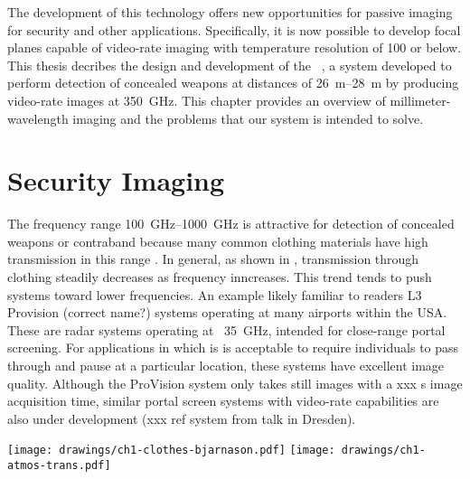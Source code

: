 The development of this technology offers new opportunities for passive imaging for security and other applications.
Specifically, it is now possible to develop focal planes capable of video-rate imaging with temperature resolution of \SI{100}{\mK} or below.
This thesis decribes the design and development of the \NIST\ \Imager, a system developed to perform detection of concealed weapons at distances of \SIrange{26}{28}{\m} by producing video-rate images at \SI{350}{\GHz}.
This chapter provides an overview of millimeter-wavelength imaging and the problems that our system is intended to solve.

\section{Security Imaging}

The frequency range \SIrange{100}{1000}{\GHz} is attractive for detection of concealed weapons or contraband because many common clothing materials have high transmission in this range \cite{bjarnason_millimeter-wave_2004}.
In general, as shown in , transmission through clothing steadily decreases as frequency inncreases.
This trend tends to push systems toward lower frequencies.
An example likely familiar to readers L3 Provision (correct name?) systems operating at many airports within the USA.
These are radar systems operating at ~\SI{35}{\GHz}, intended for close-range portal screening.
For applications in which is is acceptable to require individuals to pass through and pause at a particular location, these systems have excellent image quality.
Although the ProVision system only takes still images with a xxx s image acquisition time, similar portal screen systems with video-rate capabilities are also under development (xxx ref system from talk in Dresden).

\begin{figure*}
\centering
\texttt{[image: drawings/ch1-clothes-bjarnason.pdf]}
\texttt{[image: drawings/ch1-atmos-trans.pdf]}
\caption[Clothing and Atmospheric Transmission vs Frequency]{
  \textbf{Left}
  Plot of clothing transmission vs frequency.
  Taken from \cite{bjarnason_millimeter-wave_2004}.
  As frequency increases, transmission through all kinds of clothing decreases.
  The \SI{-10}{\dB} observation band of the \Imager\ is highlighted (\SIrange{318}{376}{\GHz}).
  \textbf{right}
  Plot showing a model of zenith atmospheric transmission on the summit of Mauna Kea, assuming \SI{0.5}{\mm} of percipital water vapor.
  The plot is illustrative only, demonstrating the presence of atmospheric transmission windows and the general trend of worse transmission at higher frequencies.
  The data was obtained using the Caltech Submillimeter Observatory (CSO) Atmospheric Transmission Interactive Plotter \cite{darek_lis_cso_????}, which is based on a published model \cite{pardo_atmospheric_2001}.
}
\label{fig:ch1-clothes-atmos-trans}
\end{figure*}


